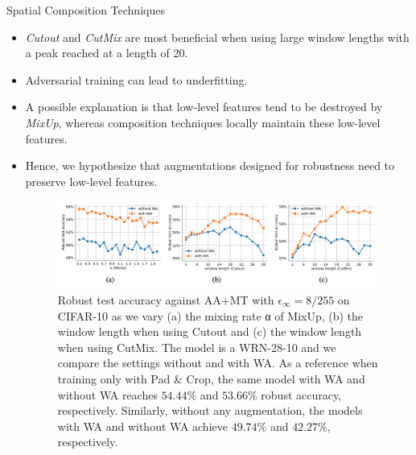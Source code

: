 \begin{frame}{Spatial Composition Techniques}
\begin{itemize}
    \item \textit{Cutout} and \textit{CutMix} are most beneficial when using large window lengths with a peak reached at a length of 20.
    \item Adversarial training can lead to underfitting. 
    \item A possible explanation is that low-level features tend to be destroyed by \textit{MixUp}, whereas composition techniques locally maintain these low-level features. 
    \item Hence, we hypothesize that augmentations designed for robustness need to preserve low-level features.
        \begin{figure}
            \centering
            \includegraphics[height=.3\textheight]{pic/data_aug_res.png}
            \caption{Robust test accuracy against AA+MT with $\epsilon_\infty = 8/255$ on CIFAR-10 as we vary (a) the mixing rate α of MixUp, (b) the window length when using Cutout and (c) the window length when using CutMix. The model is a WRN-28-10 and we compare the settings without and with WA. As a reference when training only with Pad \& Crop, the same model with WA and without WA reaches $54.44\%$ and $53.66\%$ robust accuracy, respectively. Similarly, without any augmentation, the models with WA and without WA achieve $49.74\%$ and $42.27\%$, respectively.}
            \label{fig:data_aug_res}
        \end{figure}
    \end{itemize}
\end{frame}

